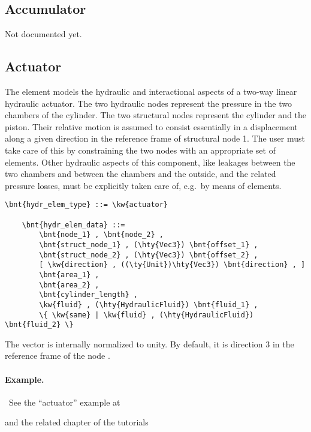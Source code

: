 \subsection{Accumulator}
\label{sec:EL:HYDR:ACCUMULATOR}
Not documented yet.



\subsection{Actuator}
The  element models the hydraulic and interactional aspects
of a two-way linear hydraulic actuator.
The two hydraulic nodes represent the pressure in the two chambers
of the cylinder.
The two structural nodes represent the cylinder and the piston.
Their relative motion is assumed to consist essentially
in a displacement along a given direction in the reference frame
of structural node 1.
The user must take care of this by constraining the two nodes
with an appropriate set of  elements.
Other hydraulic aspects of this component, like leakages between
the two chambers and between the chambers and the outside,
and the related pressure losses, must be explicitly taken care of,
e.g.\ by means of  elements.
\label{sec:EL:HYDR:ACTUATOR}
\begin{Verbatim}[commandchars=\\\{\}]
    \bnt{hydr_elem_type} ::= \kw{actuator}

    \bnt{hydr_elem_data} ::=
        \bnt{node_1} , \bnt{node_2} , 
        \bnt{struct_node_1} , (\hty{Vec3}) \bnt{offset_1} ,
        \bnt{struct_node_2} , (\hty{Vec3}) \bnt{offset_2} ,
        [ \kw{direction} , ((\ty{Unit})\hty{Vec3}) \bnt{direction} , ]
        \bnt{area_1} ,
        \bnt{area_2} ,
        \bnt{cylinder_length} ,
        \kw{fluid} , (\hty{HydraulicFluid}) \bnt{fluid_1} ,
        \{ \kw{same} | \kw{fluid} , (\hty{HydraulicFluid}) \bnt{fluid_2} \}
\end{Verbatim}
The vector  is internally normalized to unity.
By default, it is direction 3 in the reference frame of the 
node .

\paragraph{Example.} \
See the ``actuator'' example at
\begin{quote}
\end{quote}
and the related chapter of the tutorials
\begin{quote}
\end{quote}



